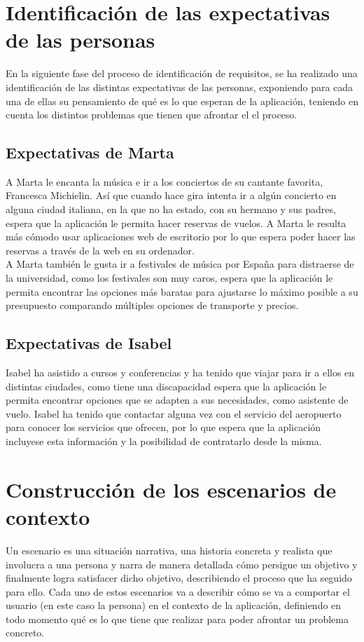 \section{Identificación de las expectativas de las personas}
En la siguiente fase del proceso de identificación  de requisitos, se ha realizado una identificación de las distintas expectativas de las personas, exponiendo para cada una 
de ellas su pensamiento de qué es lo que esperan de la aplicación, teniendo en cuenta los distintos problemas que tienen que afrontar el el proceso.

\subsection{Expectativas de Marta}
A Marta le encanta la música e ir a los conciertos de su cantante favorita, Francesca Michielin. Así que cuando hace gira intenta ir a algún concierto en alguna 
ciudad italiana, en la que no ha estado, con su hermano y sus padres, espera que la aplicación le permita hacer reservas de vuelos. A Marta le resulta más cómodo 
usar aplicaciones web de escritorio por lo que espera poder hacer las reservas a través de la web en su ordenador. \\

A Marta también le gusta ir a festivales de música por España para distraerse de la universidad, como los festivales son muy caros, espera que la aplicación 
le permita encontrar las opciones más baratas para ajustarse lo máximo posible a su presupuesto comparando múltiples opciones de transporte y precios.


\subsection{Expectativas de Isabel}
Isabel ha asistido a cursos y conferencias y ha tenido que viajar para ir a ellos en distintas ciudades, como tiene una discapacidad espera que la aplicación 
le permita encontrar opciones que se adapten a sus necesidades, como asistente de vuelo. Isabel ha tenido que contactar alguna vez con el servicio del 
aeropuerto para conocer los servicios que ofrecen, por lo que espera que la aplicación incluyese esta información y la posibilidad de contratarlo desde la misma.

\section{Construcción de los escenarios de contexto}
Un escenario es una situación narrativa, una historia concreta y realista que involucra a una persona y narra de manera detallada cómo persigue un objetivo y
finalmente logra satisfacer dicho objetivo, describiendo el proceso que ha seguido para ello. Cada uno de estos escenarios va a describir cómo se va a comportar
el usuario (en este caso la persona) en el contexto de la aplicación, definiendo en todo momento qué es lo que tiene que realizar para poder afrontar un problema
concreto.
